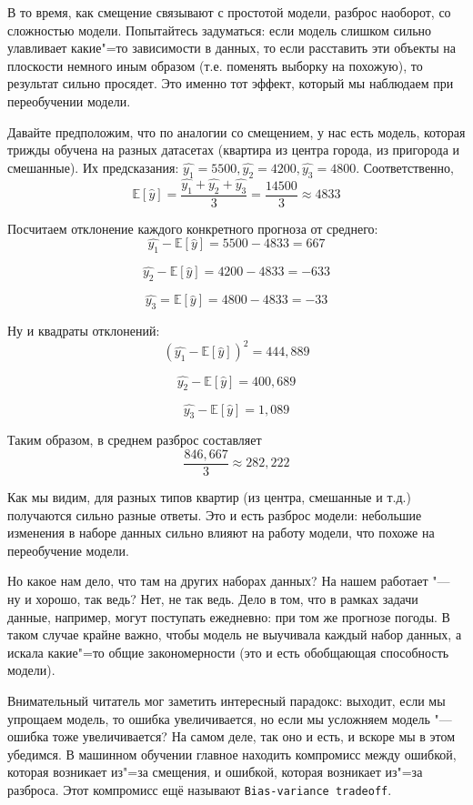 В то время, как смещение связывают с простотой модели, разброс наоборот, со сложностью модели. Попытайтесь задуматься: если модель слишком сильно улавливает какие"=то зависимости в данных, то если расставить эти объекты на плоскости немного иным образом (т.е. поменять выборку на похожую), то результат сильно просядет. Это именно тот эффект, который мы наблюдаем при переобучении модели.

Давайте предположим, что по аналогии со смещением, у нас есть модель, которая трижды обучена на разных датасетах (квартира из центра города, из пригорода и смешанные). Их предсказания: $\hat{y_1}=5500, \hat{y_2}=4200, \hat{y_3}=4800$. Соответственно,
\[
\mathbb{E}[\hat{y}] = \frac{\hat{y_1} + \hat{y_2} + \hat{y_3}}{3} = \frac{14500}{3} \approx 4833
\]

Посчитаем отклонение каждого конкретного прогноза от среднего:
\[
\hat{y_1} - \mathbb{E}[\hat{y}] = 5500 - 4833 = 667
\]

\[
\hat{y_2} - \mathbb{E}[\hat{y}] = 4200 - 4833 = -633
\]

\[
\hat{y_3} = \mathbb{E}[\hat{y}] = 4800 - 4833 = -33
\]

Ну и квадраты отклонений:
\[
(\hat{y_1} - \mathbb{E}[\hat{y}])^2 = 444,889
\]

\[
\hat{y_2} - \mathbb{E}[\hat{y}] = 400,689
\]

\[
\hat{y_3} - \mathbb{E}[\hat{y}] = 1,089
\]

Таким образом, в среднем разброс составляет
\[
\frac{846,667}{3} \approx 282,222
\]

Как мы видим, для разных типов квартир (из центра, смешанные и т.д.) получаются сильно разные ответы. Это и есть разброс модели: небольшие изменения в наборе данных сильно влияют на работу модели, что похоже на переобучение модели.

Но какое нам дело, что там на других наборах данных? На нашем работает "--- ну и хорошо, так ведь? Нет, не так ведь. Дело в том, что в рамках задачи данные, например, могут поступать ежедневно: при том же прогнозе погоды. В таком случае крайне важно, чтобы модель не выучивала каждый набор данных, а искала какие"=то общие закономерности (это и есть обобщающая способность модели).

Внимательный читатель мог заметить интересный парадокс: выходит, если мы упрощаем модель, то ошибка увеличивается, но если мы усложняем модель "--- ошибка тоже увеличивается? На самом деле, так оно и есть, и вскоре мы в этом убедимся. В машинном обучении главное находить компромисс между ошибкой, которая возникает из"=за смещения, и ошибкой, которая возникает из"=за разброса. Этот компромисс ещё называют \texttt{Bias-variance tradeoff}.

